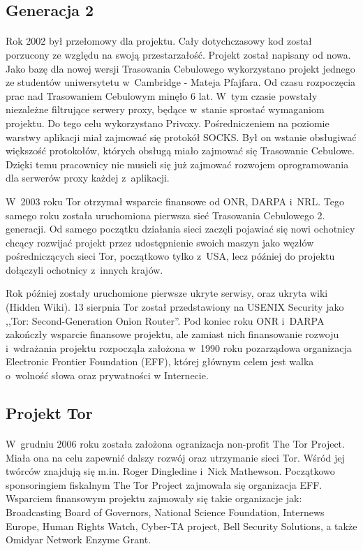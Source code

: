 \subsection{Generacja 2}\paragraph{}
Rok 2002 był przełomowy dla projektu. Cały dotychczasowy kod został porzucony ze względu na swoją przestarzałość. Projekt został napisany od nowa. Jako bazę dla nowej wersji Trasowania Cebulowego wykorzystano projekt jednego ze studentów uniwersytetu w~Cambridge - Mateja Pfajfara. Od czasu rozpoczęcia prac nad Trasowaniem Cebulowym minęło 6 lat. W~tym czasie powstały niezależne filtrujące serwery proxy, będące w~stanie sprostać wymaganiom projektu. Do tego celu wykorzystano Privoxy. Pośredniczeniem na poziomie warstwy aplikacji miał zajmować się protokół SOCKS. Był on wstanie obsługiwać większość protokołów, których obsługą miało zajmować się Trasowanie Cebulowe. Dzięki temu pracownicy nie musieli się już zajmować rozwojem oprogramowania dla serwerów proxy każdej z~aplikacji. 

W~2003 roku Tor otrzymał wsparcie finansowe od ONR, DARPA i~NRL. Tego samego roku została uruchomiona pierwsza sieć Trasowania Cebulowego 2. generacji. Od samego początku działania sieci zaczęli pojawiać się nowi ochotnicy chcący rozwijać projekt przez udostępnienie swoich maszyn jako węzłów pośredniczących sieci Tor, początkowo tylko z~USA, lecz później do projektu dołączyli ochotnicy z~innych krajów. 

Rok później zostały uruchomione pierwsze ukryte serwisy, oraz ukryta wiki (Hidden Wiki). 13 sierpnia Tor został przedstawiony na USENIX Security jako ,,Tor: Second-Generation Onion Router''. Pod koniec roku ONR i~DARPA zakończły wsparcie finansowe projektu, ale zamiast nich finansowanie rozwoju i~wdrażania projektu rozpocząła założona w~1990 roku pozarządowa organizacja Electronic Frontier Foundation (EFF), której głównym celem jest walka o~wolność słowa oraz prywatności w Internecie\cite{about_eff, onion_router_history}.

\subsection{Projekt Tor}\paragraph{}
\indent W~grudniu 2006 roku została założona ogranizacja non-profit The Tor Project. Miała ona na celu zapewnić dalszy rozwój oraz utrzymanie sieci Tor. Wśród jej twórców znajdują się m.in. Roger Dingledine i~Nick Mathewson\cite{form990}. Początkowo sponsoringiem fiskalnym The Tor Project zajmowała się organizacja EFF\cite{eff_press}. Wsparciem finansowym projektu zajmowały się takie organizacje jak: Broadcasting Board of Governors, National Science Foundation, Internews Europe, Human Rights Watch, Cyber-TA project, Bell Security Solutions, a także Omidyar Network Enzyme Grant\cite{torproject_sponsors}.

